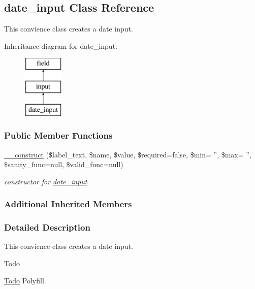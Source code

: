 \hypertarget{classdate__input}{\subsection{date\-\_\-input Class Reference}
\label{classdate__input}
}


This convience class creates a date input.  


Inheritance diagram for date\-\_\-input\-:\begin{figure}[H]
\begin{center}
\leavevmode
\includegraphics[height=3.000000cm]{classdate__input}
\end{center}
\end{figure}
\subsubsection*{Public Member Functions}
\begin{DoxyCompactItemize}
\item 
\hyperlink{classdate__input_a7fd4d2eb1d2bc73c5a1ffa16d1b98e7c}{\-\_\-\-\_\-construct} (\$label\-\_\-text, \$name, \$value, \$required=false, \$min= '', \$max= '', \$sanity\-\_\-func=null, \$valid\-\_\-func=null)
\begin{DoxyCompactList}\small\item\em constructor for \hyperlink{classdate__input}{date\-\_\-input} \end{DoxyCompactList}\end{DoxyCompactItemize}
\subsubsection*{Additional Inherited Members}


\subsubsection{Detailed Description}
This convience class creates a date input. 

\begin{DoxyRefDesc}{Todo}
\item[\hyperlink{todo__todo000005}{Todo}]Polyfill. \end{DoxyRefDesc}



